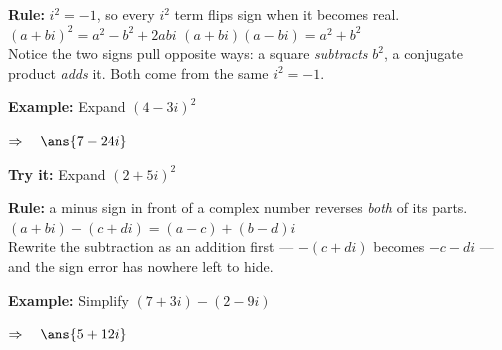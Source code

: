\documentclass[12pt]{article}
\begin{document}


\begin{formulabox}
\textbf{Rule:} $i^{2} = -1$, so every $i^{2}$ term flips sign when it becomes
real.\\[3pt]
$(a + bi)^{2} = a^{2} - b^{2} + 2abi$ \qquad $(a + bi)(a - bi) = a^{2} + b^{2}$\\[3pt]
Notice the two signs pull opposite ways: a square \textit{subtracts} $b^{2}$, a
conjugate product \textit{adds} it. Both come from the same $i^{2} = -1$.
\end{formulabox}

\begin{examplebox}
\textbf{Example:} \quad Expand $(4 - 3i)^{2}$

$\Rightarrow\quad \ans{7 - 24i}$
\end{examplebox}

\begin{tryitbox}
\textbf{Try it:} \quad Expand $(2 + 5i)^{2}$\\[2pt]
\end{tryitbox}


\begin{formulabox}
\textbf{Rule:} a minus sign in front of a complex number reverses \textit{both}
of its parts.\\[3pt]
$(a + bi) - (c + di) = (a - c) + (b - d)i$\\[3pt]
Rewrite the subtraction as an addition first --- $-(c + di)$ becomes
$-c - di$ --- and the sign error has nowhere left to hide.
\end{formulabox}

\begin{examplebox}
\textbf{Example:} \quad Simplify $(7 + 3i) - (2 - 9i)$

$\Rightarrow\quad \ans{5 + 12i}$
\end{examplebox}
\end{document}
